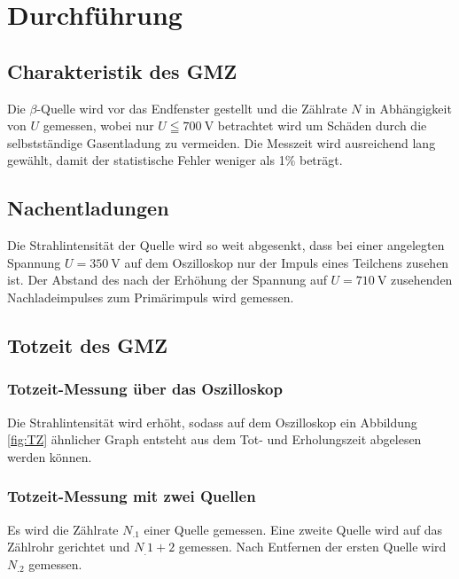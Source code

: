 \section{Durchführung}
\label{sec:Durchführung}

\subsection{Charakteristik des GMZ}
Die $\beta$-Quelle wird vor das Endfenster gestellt und die Zählrate $N$ in Abhängigkeit von $U$ gemessen, wobei nur $U\leqq \SI{700}{\volt}$ betrachtet wird um Schäden durch die selbstständige Gasentladung zu vermeiden. Die Messzeit wird ausreichend lang gewählt, damit der statistische Fehler weniger als 1\% beträgt.

\subsection{Nachentladungen}
Die Strahlintensität der Quelle wird so weit abgesenkt, dass bei einer angelegten Spannung $U=\SI{350}{\volt}$ auf dem Oszilloskop nur der Impuls eines Teilchens zusehen ist. Der Abstand des nach der Erhöhung der Spannung auf $U=\SI{710}{\volt}$ zusehenden Nachladeimpulses zum Primärimpuls wird gemessen.

\subsection{Totzeit des GMZ}
\subsubsection{Totzeit-Messung über das Oszilloskop}
Die Strahlintensität wird erhöht, sodass auf dem Oszilloskop ein Abbildung \ref{fig:TZ} ähnlicher Graph entsteht aus dem Tot- und Erholungszeit abgelesen werden können.
\subsubsection{Totzeit-Messung mit zwei Quellen}
Es wird die Zählrate $N_.1$ einer Quelle gemessen.
Eine zweite Quelle wird auf das Zählrohr gerichtet und $N_.{1+2}$ gemessen.
Nach Entfernen der ersten Quelle wird $N_.2$ gemessen.